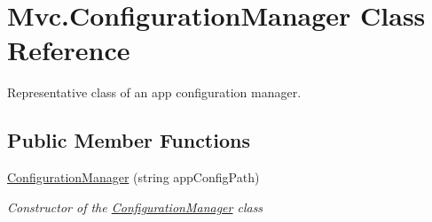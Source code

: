 \hypertarget{class_mvc_1_1_configuration_manager}{}\section{Mvc.\+Configuration\+Manager Class Reference}
\label{class_mvc_1_1_configuration_manager}


Representative class of an app configuration manager.  


\subsection*{Public Member Functions}
\begin{DoxyCompactItemize}
\item 
\hyperlink{class_mvc_1_1_configuration_manager_aa7a6bcdf5a3f46717d269896a2d822b1}{Configuration\+Manager} (string app\+Config\+Path)
\begin{DoxyCompactList}\small\item\em Constructor of the \hyperlink{class_mvc_1_1_configuration_manager}{Configuration\+Manager} class \end{DoxyCompactList}\end{DoxyCompactItemize}
